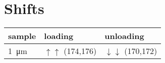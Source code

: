 \documentclass[a4paper]{report}
\begin{document}
%
%

\section{Shifts}
\begin{tabular}{lll}
  \toprule
  sample               & loading                       & unloading \\
  \midrule
  \SI{1}{\micro\meter} & $\uparrow \uparrow$ (174,176) &
  $\downarrow \downarrow$ (170,172)                                \\
  \bottomrule
\end{tabular}
\end{document}

